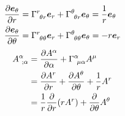 \documentclass[uplatex,dvipdfmx,a4paper,11pt]{jlreq}
\newcommand{\ee}{\bm{e}}
\theoremstyle{definition}
\begin{document}
\begin{example}[極座標]
\begin{align}
    \diffp{\ee_\theta}{r}      & = \Gamma^{r}_{\ \theta r}\ee_r + \Gamma^{\theta}_{\ \theta r}\ee_\theta = \frac{1}{r}\ee_\theta \\
    \diffp{\ee_\theta}{\theta} & = \Gamma^{r}_{\ \theta\theta}\ee_r + \Gamma^{\theta}_{\ \theta\theta}\ee_\theta = -r\ee_r
  \end{align}
  \begin{align}
    A^\alpha_{\ ;\alpha} & = \diffp{A^\alpha}{\alpha} + \Gamma^\alpha_{\ \mu\alpha}A^\mu \\
                         & = \diffp{A^r}{r} + \diffp{A^\theta}{\theta} + \frac{1}{r}A^r  \\
                         & = \frac{1}{r}\diffp{}{r}(rA^r) + \diffp{}{\theta}A^\theta
  \end{align}
\end{example}
\end{document}
